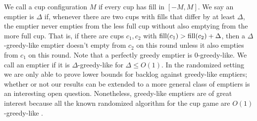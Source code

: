 
We call a cup configuration $M$ if every cup has fill
in $[-M, M]$. We say an emptier is $\Delta$
if, whenever there are two cups with fills that differ
by at least $\Delta$, the emptier never empties from the less full
cup without also emptying from the more full cup. That is, if
there are cups $c_1, c_2$ with $\operatorname{\textnormal{fill}}(c_1) > \operatorname{\textnormal{fill}}(c_2) + \Delta$,
then a $\Delta$-greedy-like emptier doesn't empty from $c_2$ on
this round unless it also empties from $c_1$ on this round.
Note that a perfectly greedy
emptier is $0$-greedy-like. We call an emptier  if it is
$\Delta$-greedy-like for $\Delta \le O(1)$.
In the randomized setting we are only able to prove lower bounds for backlog
against greedy-like emptiers; whether or not our results can be extended to a
more general class of emptiers is an interesting open question. 
Nonetheless, greedy-like emptiers are of great interest because
all the known randomized algorithm for the cup game are
$O(1)$-greedy-like \cite{mbe19, wku20}.


